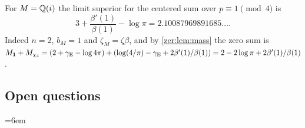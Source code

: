 \begin{example}\label{zer:ex:Qi}
For $M=\mathbb{Q}(i)$ the limit superior for the centered sum over $p\equiv1\pmod4$ is
\[
 3+\frac{\beta'(1)}{\beta(1)}-\log\pi=2.10087969891685\ldots .
\]
Indeed $n=2$, $b_M=1$ and $\zeta_M=\zeta\beta$, and by \cref{zer:lem:mass} the zero sum is
$M_{\mathbf{1}}+M_{\chi_4}=(2+\gamma_{\mathrm{E}}-\log4\pi)+(\log(4/\pi)-\gamma_{\mathrm{E}}+2\beta'(1)/\beta(1))
=2-2\log\pi+2\beta'(1)/\beta(1)$.
\end{example}

\subsection{Open questions}\label{zer:sec:open}
{\emergencystretch=6em}

